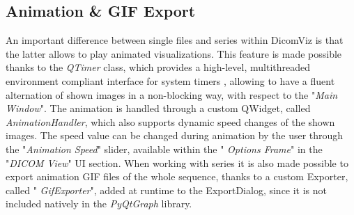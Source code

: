 \documentclass[conference]{IEEEtran}
\begin{document}
\subsection{Animation \& GIF Export}

An important difference between single files and series within DicomViz is that the latter allows to play animated visualizations. This feature is made possible thanks to the  \textit{QTimer} class, which provides a high-level, multithreaded environment compliant interface for system timers , allowing to have a fluent alternation of shown images in a non-blocking way, with respect to the "\textit{Main Window}". The animation is handled through a custom QWidget, called  \textit{AnimationHandler}, which also supports dynamic speed changes of the shown images. The speed value can be changed during animation by the user through the "\textit{Animation Speed}" slider, available within the " \textit{Options Frame}" in the "\textit{DICOM View}" UI section. When working with series it is also made possible to export animation GIF files of the whole sequence, thanks to a custom Exporter, called " \textit{GifExporter}", added at runtime to the ExportDialog, since it is not included natively in the  \textit{PyQtGraph} library.
\end{document}

